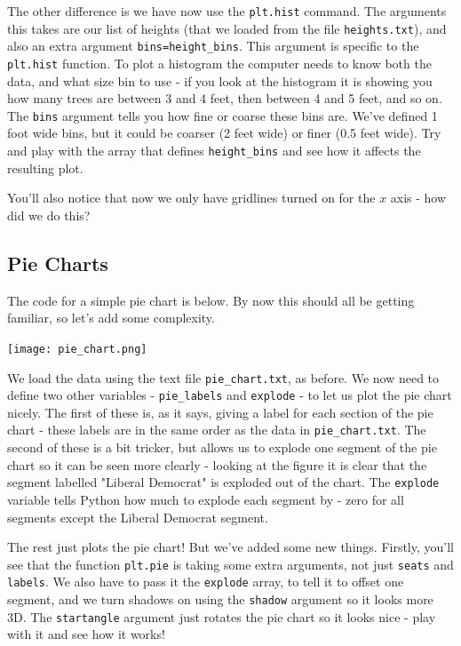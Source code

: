 \documentclass[10pt,a4paper]{memoir}
\begin{document}
The other difference is we have now use the \texttt{plt.hist} command. The arguments this takes are our list of heights (that we loaded from the file \texttt{heights.txt}), and also an extra argument \texttt{bins=height\_bins}. This argument is specific to the \texttt{plt.hist} function. To plot a histogram the computer needs to know both the data, and what size bin to use - if you look at the histogram it is showing you how many trees are between 3 and 4 feet, then between 4 and 5 feet, and so on. The \texttt{bins} argument tells you how fine or coarse these bins are. We've defined 1 foot wide bins, but it could be coarser (2 feet wide) or finer (0.5 feet wide). Try and play with the array that defines \texttt{height\_bins} and see how it affects the resulting plot.

You'll also notice that now we only have gridlines turned on for the $x$ axis - how did we do this?

\subsection{Pie Charts}
The code for a simple pie chart is below. By now this should all be getting familiar, so let's add some complexity.

\begin{minipage}{0.48\textwidth}
\end{minipage}
\quad
\begin{minipage}{0.48\textwidth}
		\centering
		\texttt{[image: pie\_chart.png]}
\end{minipage}

We load the data using the text file \texttt{pie\_chart.txt}, as before. We now need to define two other variables - \texttt{pie\_labels} and \texttt{explode} - to let us plot the pie chart nicely. The first of these is, as it says, giving a label for each section of the pie chart - these labels are in the same order as the data in \texttt{pie\_chart.txt}. The second of these is a bit tricker, but allows us to explode one segment of the pie chart so it can be seen more clearly - looking at the figure it is clear that the segment labelled "Liberal Democrat" is exploded out of the chart. The \texttt{explode} variable tells Python how much to explode each segment by - zero for all segments except the Liberal Democrat segment.

The rest just plots the pie chart! But we've added some new things. Firstly, you'll see that the function \texttt{plt.pie} is taking some extra arguments, not just \texttt{seats} and \texttt{labels}. We also have to pass it the \texttt{explode} array, to tell it to offset one segment, and we turn shadows on using the \texttt{shadow} argument so it looks more 3D. The \texttt{startangle} argument just rotates the pie chart so it looks nice - play with it and see how it works!
\end{document}
